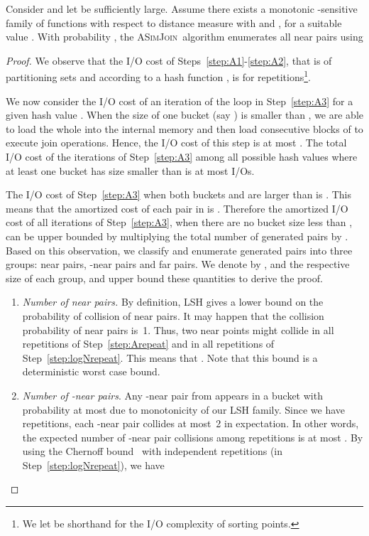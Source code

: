 \documentclass{llncs}
\newcommand{\ASimJoin}{\textsc{ASimJoin}}
\begin{document}
\begin{theorem}\label{thm:aware}
Consider  and let  be sufficiently large. 
Assume there exists a monotonic -sensitive family of functions with respect to distance measure  with  and , for a suitable value .
With probability , the \ASimJoin\ algorithm enumerates all near pairs 
using

\end{theorem}


\begin{proof}

We observe that the I/O cost of Steps~\ref{step:A1}-\ref{step:A2}, that is of partitioning sets  and  according to a hash function , is  for  repetitions\footnote{We let  be shorthand for the I/O complexity \cite{Vitter08} of sorting  points.}. 

We now consider the I/O cost of an iteration of the loop in Step~\ref{step:A3} for a given hash value . 
When the size of one bucket (say ) is smaller than , we are able to load the whole  into the internal memory and then load consecutive blocks of  to execute join operations. 
Hence, the I/O cost of this step is at most .
The total I/O cost of the  iterations of Step~\ref{step:A3} among
all possible hash values where at least one bucket has size smaller than 
is at most   I/Os.

The I/O cost of Step~\ref{step:A3} when both buckets  and  are larger than  is . 
This means that the amortized cost of each pair in  is . 
Therefore the amortized I/O cost of all iterations of Step~\ref{step:A3}, when there are no bucket size less than , can be upper bounded by multiplying the total number of generated pairs by .
Based on this observation, we classify and enumerate generated pairs into three groups: near pairs, -near pairs and far pairs. We denote by ,  and  the respective size of each group, and upper bound these quantities to derive the proof.
\begin{enumerate}

\item \emph{Number of near pairs.} By definition, LSH gives a lower bound on the probability of collision of near pairs. 
It may happen that the collision probability of near pairs is~1. 
Thus, two near points might collide in all  repetitions of
Step~\ref{step:Arepeat} and in all  repetitions of
Step~\ref{step:logNrepeat}. 
This means that . Note that this
bound is a deterministic worst case bound.

\item \emph{Number of -near pairs}. Any -near pair from  appears in a bucket with probability at most  due to monotonicity of our LSH family. 
Since we have  repetitions, each -near pair collides at most~2 in
expectation. 
In other words, the expected number of -near pair collisions among 
repetitions is at most .
By using the Chernoff bound~\cite[Exercise 1.1]{PanconesiDubhashiBook} with
 independent  repetitions (in Step~\ref{step:logNrepeat}), we
have 





\end{enumerate}
\end{proof}
\end{document}
